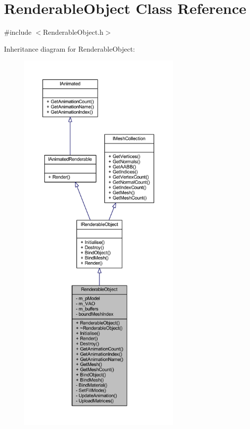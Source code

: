 \hypertarget{class_renderable_object}{}\section{Renderable\+Object Class Reference}
\label{class_renderable_object}


{\ttfamily \#include $<$Renderable\+Object.\+h$>$}



Inheritance diagram for Renderable\+Object\+:
\nopagebreak
\begin{figure}[H]
\begin{center}
\leavevmode
\includegraphics[height=550pt]{class_renderable_object__inherit__graph}
\end{center}
\end{figure}


